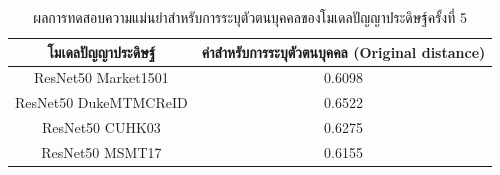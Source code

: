 \begin{table}[!ht]
    \centering
    \begin{tabular}{|c|c|}
		\hline
		{โมเดลปัญญาประดิษฐ์}&{ค่าสำหรับการระบุตัวตนบุคคล (Original distance)}							\\
		\hline
		ResNet50 Market1501	 			& 0.6098								\\
		ResNet50 DukeMTMCReID			& 0.6522								\\
		ResNet50 CUHK03				& 0.6275								\\
		ResNet50 MSMT17				& 0.6155								\\
	\hline
    \end{tabular}
    \caption{ผลการทดสอบความแม่นยำสำหรับการระบุตัวตนบุคคลของโมเดลปัญญาประดิษฐ์ครั้งที่ 5}
    \label{tab: Original distant of image 5}
\end{table}
\clearpage
